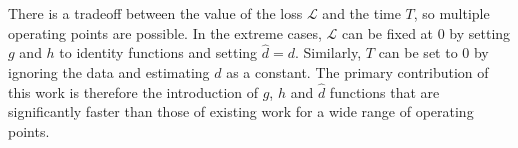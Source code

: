 

There is a tradeoff between the value of the loss $\mathcal{L}$ and the time $T$, so multiple operating points are possible. In the extreme cases, $\mathcal{L}$ can be fixed at 0 by setting $g$ and $h$ to identity functions and setting $\hat{d} = d$. Similarly, $T$ can be set to $0$ by ignoring the data and estimating $d$ as a constant. The primary contribution of this work is therefore the introduction of $g$, $h$ and $\hat{d}$ functions that are significantly faster than those of existing work for a wide range of operating points.



